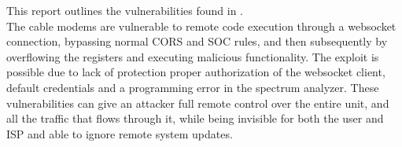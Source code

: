 This report outlines the \exploitname{} vulnerabilities found in \product. \bigskip \\
The cable modems are vulnerable to remote code execution through a websocket connection, bypassing normal CORS and SOC rules, and then subsequently by overflowing the registers and executing malicious functionality.
The exploit is possible due to lack of protection proper authorization of the websocket client, default credentials and a programming error in the spectrum analyzer.
These vulnerabilities can give an attacker full remote control over the entire unit, and all the traffic that flows through it, while being invisible for both the user and ISP and able to ignore remote system updates.